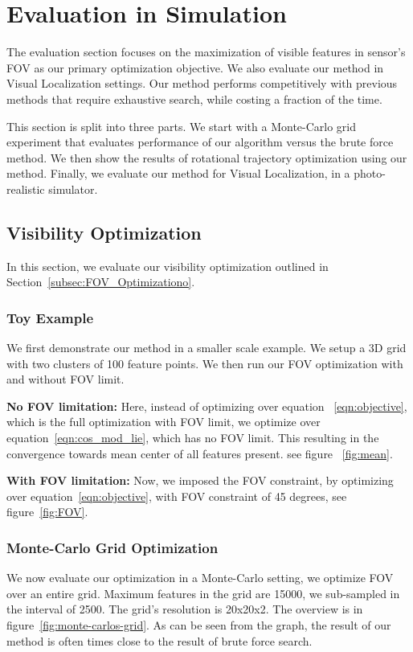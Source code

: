 \documentclass[letterpaper, 10 pt, conference]{ieeeconf}  %
\begin{document}
\section{Evaluation in Simulation}
The evaluation section focuses on the maximization of visible features in sensor’s FOV as our primary optimization objective. We also evaluate our method in Visual Localization settings. Our method performs competitively with previous methods that require exhaustive search, while costing a fraction of the time.

This section is split into three parts. We start with a Monte-Carlo grid experiment that evaluates performance of our algorithm versus the brute force method. We then show the results of rotational trajectory optimization using our method. Finally, we evaluate our method for Visual Localization, in a photo-realistic simulator.

\subsection{Visibility Optimization}
In this section, we evaluate our visibility optimization outlined in Section~\ref{subsec:FOV_Optimizationo}.
\subsubsection{Toy Example}
We first demonstrate our method in a smaller scale example.  We setup a 3D grid with two clusters of 100 feature points. We then run our FOV optimization with and without FOV limit.

\noindent \textbf{No FOV limitation:} Here, instead of optimizing over equation ~\ref{eqn:objective}, which is the full optimization with FOV limit, we optimize over equation~\ref{eqn:cos_mod_lie}, which has no FOV limit. This resulting in the convergence towards mean center of all features present.
 see figure ~\ref{fig:mean}.

\noindent \textbf{With FOV limitation:} Now, we imposed the FOV constraint, by optimizing over equation~\ref{eqn:objective}, with FOV constraint of 45 degrees, see figure~\ref{fig:FOV}.

\subsubsection{Monte-Carlo Grid Optimization}

We now evaluate our optimization in a Monte-Carlo setting, we optimize FOV over an entire grid. Maximum features in the grid are 15000, we sub-sampled in the interval of 2500. The grid's resolution is 20x20x2. The overview is in figure~\ref{fig:monte-carlos-grid}. As can be seen from the graph, the result of our method is often times close to the result of brute force search.
\end{document}
